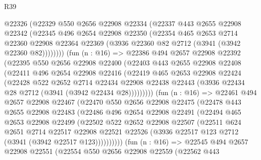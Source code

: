 \begin{lexlean}{R39}
\begin{coremodule}
          @22326
          (@22329
            @550
            @2656
            @22908
            @22334
            (@22337
              @443
              @2655
              @22908
              @22342
              (@22345
                @496
                @2654
                @22908
                @22350
                (@22354
                  @465
                  @2653
                  @2714
                  @22360
                  @22908
                  @22364
                  @22369
                  (@3936 @22360 @82 @2712 (@3941 (@3942 @22360 @82))))))))
        (fun (n : @16) =>
        @22386
          @494
          @2657
          @22908
          @22392
          (@22395
            @550
            @2656
            @22908
            @22400
            (@22403
              @443
              @2655
              @22908
              @22408
              (@22411
                @496
                @2654
                @22908
                @22416
                (@22419
                  @465
                  @2653
                  @22908
                  @22424
                  (@22428
                    @522
                    @2652
                    @2714
                    @22434
                    @22908
                    @22438
                    @22443
                    (@3936 @22434 @28 @2712 (@3941 (@3942 @22434 @28)))))))))
        (fun (n : @16) =>
        @22461
          @494
          @2657
          @22908
          @22467
          (@22470
            @550
            @2656
            @22908
            @22475
            (@22478
              @443
              @2655
              @22908
              @22483
              (@22486
                @496
                @2654
                @22908
                @22491
                (@22494
                  @465
                  @2653
                  @22908
                  @22499
                  (@22502
                    @522
                    @2652
                    @22908
                    @22507
                    (@22511
                      @624
                      @2651
                      @2714
                      @22517
                      @22908
                      @22521
                      @22526
                      (@3936 @22517 @123 @2712 (@3941 (@3942 @22517 @123))))))))))
        (fun (n : @16) =>
        @22545
          @494
          @2657
          @22908
          @22551
          (@22554
            @550
            @2656
            @22908
            @22559
            (@22562
              @443

\end{coremodule}
\end{lexlean}
